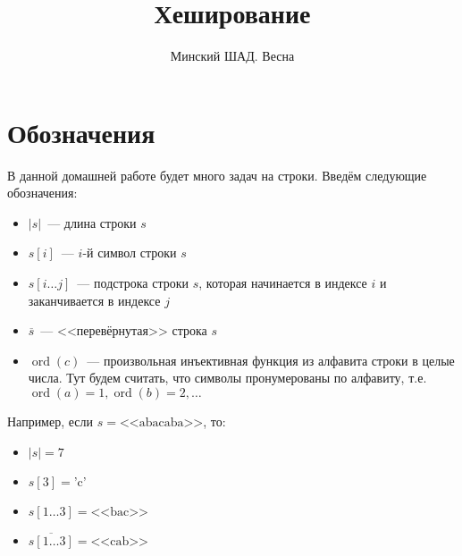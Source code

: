 \documentclass[addpoints]{exam}
\title{Хеширование}
\author{Минский ШАД. Весна}
\DeclareMathOperator{\ord}{ord}
\begin{document}
\printanswers
\maketitle

\section{Обозначения}

В данной домашней работе будет много задач на строки. Введём следующие обозначения:

\begin{itemize}
\item $|s|$~--- длина строки $s$
\item $s[i]$~--- $i$-й символ строки $s$
\item $s[i \ldots j]$~--- подстрока строки $s$, которая начинается в индексе $i$ и заканчивается в индексе $j$
\item $\overline{s}$~--- <<перевёрнутая>> строка $s$ 
\item $\ord(c)$~--- произвольная инъективная функция из алфавита строки в целые числа. Тут будем считать, что символы пронумерованы по алфавиту, т.е. $\ord(a) = 1, \ord(b) = 2, \ldots$ 
\end{itemize}

Например, если $s = \mbox{<<abacaba>>}$, то:

\begin{itemize}
\item $|s| = 7$ 
\item $s[3] = \mbox{'c'}$
\item $s[1\ldots3] = \mbox{<<bac>>}$
\item $\overline{s[1 \ldots 3]} = \mbox{<<cab>>}$  
\end{itemize}
\end{document}
